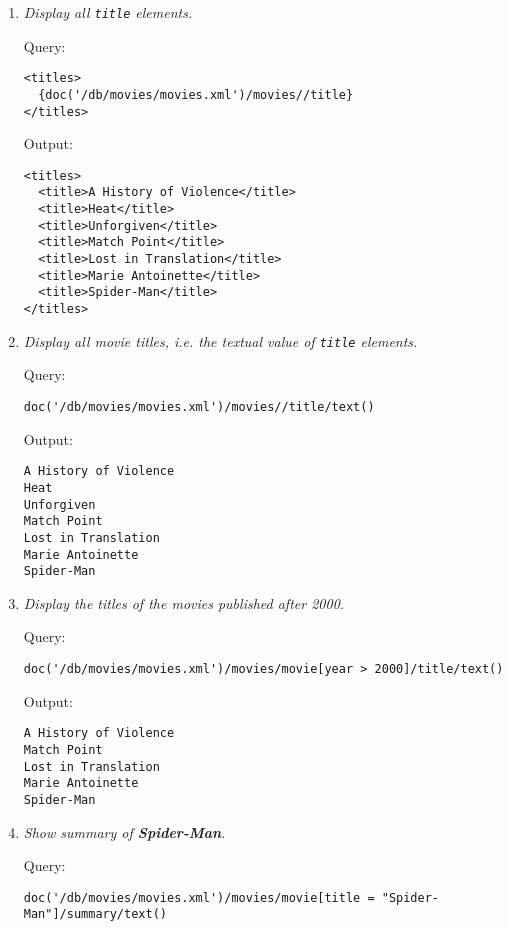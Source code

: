 \documentclass[a4paper, notitlepage]{article}
\begin{document}
\begin{enumerate}
\item 
  \emph{Display all \lstinline{title} elements.} 
  
Query: 
  
\begin{lstlisting}
<titles>
  {doc('/db/movies/movies.xml')/movies//title}
</titles>
\end{lstlisting}
  
Output:
  
\begin{lstlisting}
<titles>
  <title>A History of Violence</title>
  <title>Heat</title>
  <title>Unforgiven</title>
  <title>Match Point</title>
  <title>Lost in Translation</title>
  <title>Marie Antoinette</title>
  <title>Spider-Man</title>
</titles>
\end{lstlisting}
  
\item 
  \emph{Display all movie titles, i.e. the textual value of \lstinline{title} elements.} 
  
Query: 
  
\begin{lstlisting}
doc('/db/movies/movies.xml')/movies//title/text()
\end{lstlisting}
  
Output:
  
\begin{lstlisting}
A History of Violence
Heat
Unforgiven
Match Point
Lost in Translation
Marie Antoinette
Spider-Man
\end{lstlisting}  

\item 
  \emph{Display the titles of the movies published after 2000.} 
  
Query: 
  
\begin{lstlisting}
doc('/db/movies/movies.xml')/movies/movie[year > 2000]/title/text()
\end{lstlisting}
  
Output:
  
\begin{lstlisting}
A History of Violence
Match Point
Lost in Translation
Marie Antoinette
Spider-Man
\end{lstlisting}  

\item 
  \emph{Show summary of \textbf{Spider-Man}.} 
  
Query: 
  
\begin{lstlisting}
doc('/db/movies/movies.xml')/movies/movie[title = "Spider-Man"]/summary/text()
\end{lstlisting}
  

\end{enumerate}
\end{document}
